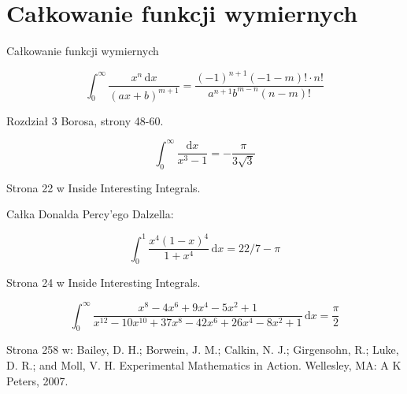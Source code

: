 %

\section{Całkowanie funkcji wymiernych}
Całkowanie funkcji wymiernych

\begin{integral}
\begin{equation}
    \int_0^\infty \frac{x^n \,\mathrm{d}x}{(ax+b)^{m+1}}  = \frac{(-1)^{n+1} (-1-m)! \cdot n!}{a^{n+1} b^{m-n} (n-m)!}
\end{equation}
\end{integral}

\begin{solution}
    Rozdział 3 Borosa, strony 48-60.
\end{solution}

\begin{integral}
\begin{equation}
    \int_0^\infty \frac{\mathrm{d}x}{x^3 - 1} = - \frac{\pi}{3\sqrt{3}}
\end{equation}
\end{integral}

\begin{solution}
    Strona 22 w Inside Interesting Integrals.
\end{solution}


Całka Donalda Percy'ego Dalzella:
\begin{integral}
\begin{equation}
    \int_0^1 \frac{x^4(1-x)^4}{1 + x^4} \,\mathrm{d}x = 22/7 - \pi
\end{equation}
\end{integral}

\begin{solution}
    Strona 24 w Inside Interesting Integrals.
\end{solution}


\begin{integral}
\begin{equation}
    \int_0^\infty \frac{x^8-4x^6+9x^4-5x^2+1}{x^{12}-10x^{10}+37x^8-42x^6+26x^4-8x^2+1} \,\mathrm{d}x = \frac{\pi}{2}
\end{equation}
\end{integral}

\begin{solution}
    Strona 258 w: Bailey, D. H.; Borwein, J. M.; Calkin, N. J.; Girgensohn, R.; Luke, D. R.; and Moll, V. H. Experimental Mathematics in Action. Wellesley, MA: A K Peters, 2007.
\end{solution}

%